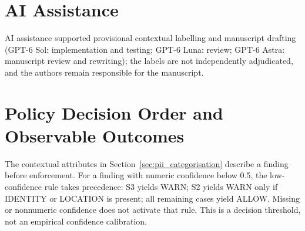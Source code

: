 \documentclass[sigconf]{acmart}
\theoremstyle{acmdefinition}\newtheorem{property}{Property}
\begin{document}
\section*{AI Assistance}
AI assistance supported provisional contextual labelling and manuscript drafting (GPT-6 Sol: implementation and testing; GPT-6 Luna: review; GPT-6 Astra: manuscript review and rewriting); the labels are not independently adjudicated, and the authors remain responsible for the manuscript.\label{body:end}




\appendix
\section{Policy Decision Order and Observable Outcomes}
\label{app:policy}
The contextual attributes in Section~\ref{sec:pii_categorisation} describe a finding before enforcement. For a finding with numeric confidence below 0.5, the low-confidence rule takes precedence: S3 yields WARN; S2 yields WARN only if IDENTITY or LOCATION is present; all remaining cases yield ALLOW. Missing or nonnumeric confidence does not activate that rule. This is a decision threshold, not an empirical confidence calibration.
\end{document}
